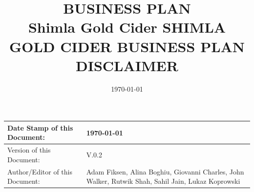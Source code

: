 \documentclass[11pt]{article}
\begin{document}
\title{\vspace{100px} BUSINESS PLAN \\ \vspace{100px} Shimla Gold Cider \vspace{100px}}


\date{\today}         %

\maketitle           %

\newpage

\title{ \hspace{100px} SHIMLA GOLD CIDER BUSINESS PLAN}
\maketitle

\begin{table}[H]
\begin{center}
\begin{tabular}{| p{7cm} | p{7cm} |}
\hline
Date Stamp of this Document:     &  \today  \\
\hline
Version of this Document:        &  V.0.2  \\
\hline
Author/Editor of this Document:  & Adam Fiksen, \newline Alina Boghiu, \newline Giovanni Charles, \newline John Walker, \newline Rutwik Shah, \newline Sahil Jain, \newline Lukaz Koprowski  \\
\hline
\end{tabular}
\end{center}
\end{table}

\title{ \hspace{175px} DISCLAIMER \\}
\maketitle
\end{document}
